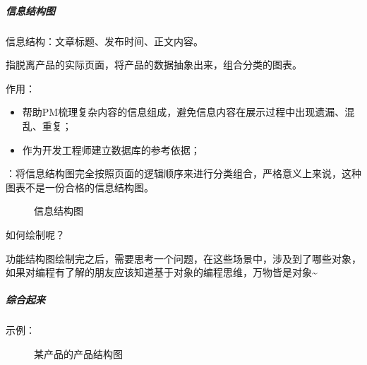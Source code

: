 \documentclass[letterpaper,11pt,english]{sphinxmanual}
\begin{document}
\subparagraph{信息结构图}
\label{\detokenize{chapter_knowledge/flow_chart:id31}}
信息结构：文章标题、发布时间、正文内容。%
\begin{footnote}[525]\sphinxAtStartFootnote
{}
%
\end{footnote}

指脱离产品的实际页面，将产品的数据抽象出来，组合分类的图表。

作用：
\begin{itemize}
\item {} 
帮助PM梳理复杂内容的信息组成，避免信息内容在展示过程中出现遗漏、混乱、重复；

\item {} 
作为开发工程师建立数据库的参考依据；

\end{itemize}

：将信息结构图完全按照页面的逻辑顺序来进行分类组合，严格意义上来说，这种图表不是一份合格的信息结构图。%
\begin{footnote}[526]\sphinxAtStartFootnote
{}
%
\end{footnote}

\begin{figure}[H]
\centering
\capstart

\noindent{}
\caption{信息结构图}\label{\detokenize{chapter_knowledge/flow_chart:id45}}\end{figure}

如何绘制呢？

功能结构图绘制完之后，需要思考一个问题，在这些场景中，涉及到了哪些对象，如果对编程有了解的朋友应该知道基于对象的编程思维，万物皆是对象\textasciitilde{}%
\begin{footnote}[527]\sphinxAtStartFootnote
{}
%
\end{footnote}


\subparagraph{综合起来}
\label{\detokenize{chapter_knowledge/flow_chart:id32}}
示例：

\begin{figure}[H]
\centering
\capstart

\noindent{}
\caption{某产品的产品结构图}\label{\detokenize{chapter_knowledge/flow_chart:id46}}\end{figure}
\end{document}
